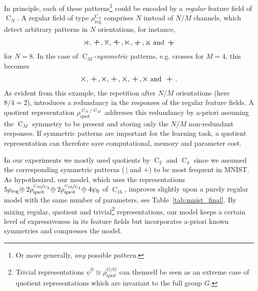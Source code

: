 \documentclass{article}
\newcommand{\C}[1]{\ensuremath{\operatorname{C}_{#1}}}
\newcommand{\CN}{\ensuremath{\operatorname{C}_{\!N}}}
\begin{document}
In principle, each of these patterns\footnote{Or more generally, \textit{any} possible pattern.}
could be encoded by a \textit{regular} feature field of $\CN$.
A regular field of type $\rho_\text{reg}^{\CN}$ comprises $N$ instead of $N/M$ channels, which detect arbitrary patterns in $N$ orientations, for instance,
$$
\mathbin{\rotatebox[origin=c]{  0}{$\scaleobj{1.2}{\rtimes}$}},
\mathbin{\rotatebox[origin=c]{ 45}{$\scaleobj{1.2}{\rtimes}$}},
\mathbin{\rotatebox[origin=c]{ 90}{$\scaleobj{1.2}{\rtimes}$}},
\mathbin{\rotatebox[origin=c]{135}{$\scaleobj{1.2}{\rtimes}$}},
\mathbin{\rotatebox[origin=c]{180}{$\scaleobj{1.2}{\rtimes}$}},
\mathbin{\rotatebox[origin=c]{225}{$\scaleobj{1.2}{\rtimes}$}},
\mathbin{\rotatebox[origin=c]{270}{$\scaleobj{1.2}{\rtimes}$}}\ \text{and}\ 
\mathbin{\rotatebox[origin=c]{315}{$\scaleobj{1.2}{\rtimes}$}}
$$
for $N=8$.
In the case of $\C{M}$-\textit{symmetric} patterns, e.g. crosses for $M=4$, this becomes
$$
\mathbin{\rotatebox[origin=c]{  0}{$\scaleobj{1.2}{\times}$}},
\mathbin{\rotatebox[origin=c]{ 45}{$\scaleobj{1.2}{\times}$}},
\mathbin{\rotatebox[origin=c]{ 90}{$\scaleobj{1.2}{\times}$}},
\mathbin{\rotatebox[origin=c]{135}{$\scaleobj{1.2}{\times}$}},
\mathbin{\rotatebox[origin=c]{180}{$\scaleobj{1.2}{\times}$}},
\mathbin{\rotatebox[origin=c]{225}{$\scaleobj{1.2}{\times}$}},
\mathbin{\rotatebox[origin=c]{270}{$\scaleobj{1.2}{\times}$}}\ \text{and}\ 
\mathbin{\rotatebox[origin=c]{315}{$\scaleobj{1.2}{\times}$}}.
$$
As evident from this example, the repetition after $N/M$ orientations (here $8/4=2$), introduces a redundancy in the responses of the regular feature fields.
A quotient representation $\rho_\text{quot}^{\CN\!\!/\!\C{M}}$ addresses this redundancy by a-priori assuming the $\C{M}$ symmetry to be present and storing only the $N/M$ non-redundant responses.
If symmetric patterns are important for the learning task, a quotient representation can therefore save computational, memory and parameter cost.

In our experiments we mostly used quotients by $\C2$ and $\C4$ since we assumed the corresponding symmetric patterns ($\,|$ and $+$) to be most frequent in MNIST.
As hypothesized, our model, which uses the representations
$5\rho_\text{reg}\!\oplus2\rho_\text{quot}^{\nicefrac{\C{16}}{\C{2}}}\!\oplus2\rho_\text{quot}^{\nicefrac{\C{16}}{\C{4}}}\!\oplus4\psi_0$
of $\C{16}$, improves slightly upon a purely regular model with the same number of parameters, see Table~\ref{tab:mnist_final}.
By mixing regular, quotient and trivial\footnote{Trivial representations $\psi^0\cong\rho_\text{quot}^{G/G}$ can themself be seen as an extreme case of quotient representations which are invariant to the full group $G$.}
representations, our model keeps a certain level of expressiveness in its feature fields but incorporates a-priori known symmetries and compresses the model.
\end{document}
